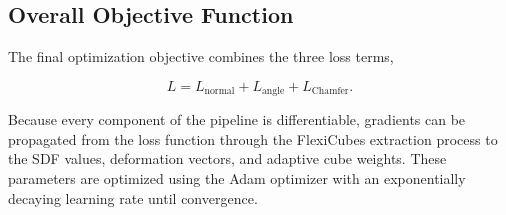 \documentclass[../main.tex]{subfiles}
\begin{document}
\subsection{Overall Objective Function}

The final optimization objective combines the three loss terms,

\[
L
=
L_{\mathrm{normal}}
+
L_{\mathrm{angle}}
+
L_{\mathrm{Chamfer}}.
\]

Because every component of the pipeline is differentiable, gradients can be propagated from the loss function through the FlexiCubes extraction process to the SDF values, deformation vectors, and adaptive cube weights. These parameters are optimized using the Adam optimizer with an exponentially decaying learning rate until convergence.
\end{document}
